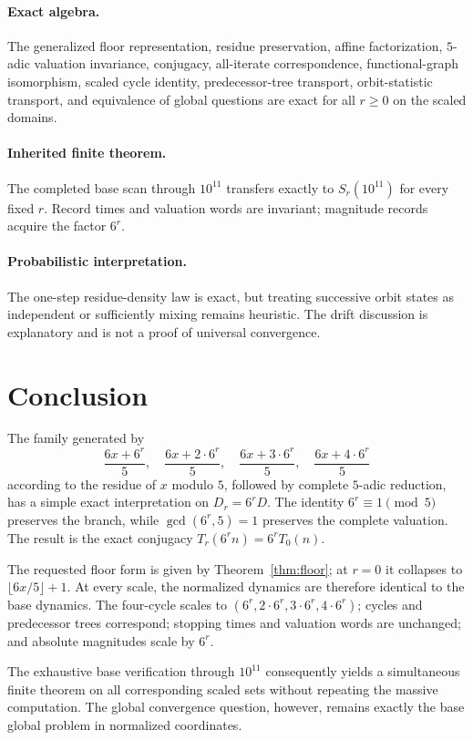 \documentclass[11pt]{article}
\theoremstyle{remark}\newtheorem{remark}[theorem]{Remark}\newtheorem{example}[theorem]{Example}
\begin{document}
\paragraph{Exact algebra.} The generalized floor representation, residue preservation, affine factorization, $5$-adic valuation invariance, conjugacy, all-iterate correspondence, functional-graph isomorphism, scaled cycle identity, predecessor-tree transport, orbit-statistic transport, and equivalence of global questions are exact for all $r\ge0$ on the scaled domains.

\paragraph{Inherited finite theorem.} The completed base scan through $10^{11}$ transfers exactly to $S_r(10^{11})$ for every fixed $r$. Record times and valuation words are invariant; magnitude records acquire the factor $6^r$.

\paragraph{Probabilistic interpretation.} The one-step residue-density law is exact, but treating successive orbit states as independent or sufficiently mixing remains heuristic. The drift discussion is explanatory and is not a proof of universal convergence.

\section{Conclusion}
The family generated by
\[
\frac{6x+6^r}{5},\quad\frac{6x+2\cdot6^r}{5},\quad\frac{6x+3\cdot6^r}{5},\quad\frac{6x+4\cdot6^r}{5}
\]
according to the residue of $x$ modulo $5$, followed by complete $5$-adic reduction, has a simple exact interpretation on $D_r=6^rD$. The identity $6^r\equiv1\pmod5$ preserves the branch, while $\gcd(6^r,5)=1$ preserves the complete valuation. The result is the exact conjugacy $T_r(6^rn)=6^rT_0(n)$.

The requested floor form is given by Theorem~\ref{thm:floor}; at $r=0$ it collapses to $\lfloor6x/5\rfloor+1$. At every scale, the normalized dynamics are therefore identical to the base dynamics. The four-cycle scales to $(6^r,2\cdot6^r,3\cdot6^r,4\cdot6^r)$; cycles and predecessor trees correspond; stopping times and valuation words are unchanged; and absolute magnitudes scale by $6^r$.

The exhaustive base verification through $10^{11}$ consequently yields a simultaneous finite theorem on all corresponding scaled sets without repeating the massive computation. The global convergence question, however, remains exactly the base global problem in normalized coordinates.
\end{document}

